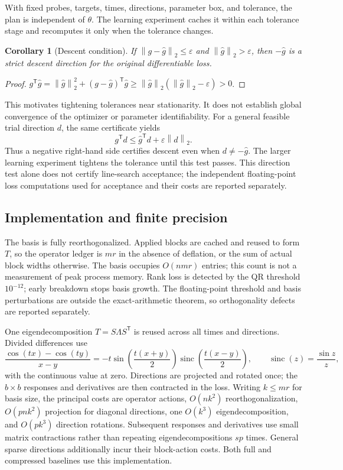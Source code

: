 \documentclass[10pt,letterpaper,twoside]{article}
\newcommand{\norm}[1]{\left\lVert #1\right\rVert}
\newcommand{\ghat}{\widehat g}
\newtheorem{corollary}{Corollary}
\begin{document}
With fixed probes, targets, times, directions, parameter box, and tolerance,
the plan is independent of $\theta$. The learning experiment caches it within
each tolerance stage and recomputes it only when the tolerance changes.
\begin{corollary}[Descent condition]
If $\norm{g-\ghat}_2\le\varepsilon$ and $\norm{\ghat}_2>\varepsilon$, then
$-\ghat$ is a strict descent direction for the original differentiable loss.
\end{corollary}
\begin{proof}
$g^{\mathsf T}\ghat=\norm{\ghat}_2^2+(g-\ghat)^{\mathsf T}\ghat
\ge\norm{\ghat}_2(\norm{\ghat}_2-\varepsilon)>0$.
\end{proof}
This motivates tightening tolerances near stationarity. It does not establish
global convergence of the optimizer or parameter identifiability.
For a general feasible trial direction $d$, the same certificate yields
\begin{equation}
 g^{\mathsf T}d\le\ghat^{\mathsf T}d+\varepsilon\norm d_2.
 \label{eq:direction}
\end{equation}
Thus a negative right-hand side certifies descent even when $d\ne-\ghat$.
The larger learning experiment tightens the tolerance until this test passes.
This direction test alone does not certify line-search acceptance; the
independent floating-point loss computations used for acceptance and their
costs are reported separately.

\subsection{Implementation and finite precision}
The basis is fully reorthogonalized. Applied blocks are cached and reused to
form $T$, so the operator ledger is $mr$ in the absence of deflation, or the
sum of actual block widths otherwise. The basis occupies $O(nmr)$ entries;
this count is not a measurement of peak process memory. Rank loss is detected
by the QR threshold $10^{-12}$; early breakdown stops basis growth. The
floating-point threshold and basis perturbations are outside the exact-arithmetic
theorem, so orthogonality defects are reported separately.

One eigendecomposition $T=S\Lambda S^{\mathsf T}$ is reused across all times
and directions. Divided differences use
\begin{equation}
 \frac{\cos(tx)-\cos(ty)}{x-y}=-t\sin\!\left(\frac{t(x+y)}2\right)
 \operatorname{sinc}\!\left(\frac{t(x-y)}2\right),\qquad
 \operatorname{sinc}(z)=\frac{\sin z}{z},
\end{equation}
with the continuous value at zero. Directions are projected and rotated once;
the $b\times b$ responses and derivatives are then contracted in the loss.
Writing $k\le mr$ for basis size, the principal costs are operator actions,
$O(nk^2)$ reorthogonalization, $O(pnk^2)$ projection for diagonal directions,
one $O(k^3)$ eigendecomposition, and $O(pk^3)$ direction rotations. Subsequent
responses and derivatives use small matrix contractions rather than repeating
eigendecompositions $sp$ times. General sparse directions additionally incur
their block-action costs. Both full and compressed baselines use this implementation.
\end{document}
